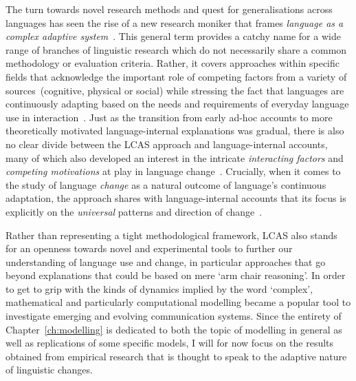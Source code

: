 The turn towards novel research methods and quest for generalisations across languages has seen the rise of a new research moniker that frames \emph{language as a complex adaptive system}~\citep[\emph{LCAS} for short, see e.g.][]{Steels1998,Steels2000,Smith2003,Situngkir2004}. This general term provides a catchy name for a wide range of branches of linguistic research which do not necessarily share a common methodology or evaluation criteria. Rather, it covers approaches within specific fields that acknowledge the important role of competing factors from a variety of sources~(cognitive, physical or social) while stressing the fact that languages are continuously adapting based on the needs and requirements of everyday language use in interaction~\citep{LCAS2009}. Just as the transition from early ad-hoc accounts to more theoretically motivated language-internal explanations was gradual, there is also no clear divide between the LCAS approach and language-internal accounts, many of which also developed an interest in the intricate \emph{interacting factors} and \emph{competing motivations} at play in language change~\citep{Vachek1962,Berg1998,Thomsen2006,Wedel2009,MacWhinney2014}.
Crucially, when it comes to the study of language \emph{change} as a natural outcome of language's continuous adaptation, the approach shares with language-internal accounts that its focus is explicitly on the \emph{universal} patterns and direction of change~\citep[p.4-5]{LCAS2009}.

Rather than representing a tight methodological framework, LCAS also stands for an openness towards novel and experimental tools to further our understanding of language use and change, in particular approaches that go beyond explanations that could be based on mere `arm chair reasoning'. In order to get to grip with the kinds of dynamics implied by the word `complex', mathematical and particularly computational modelling became a popular tool to investigate emerging and evolving communication systems. Since the entirety of Chapter~\ref{ch:modelling} is dedicated to both the topic of modelling in general as well as replications of some specific models, I will for now focus on the results obtained from empirical research that is thought to speak to the adaptive nature of linguistic changes.

